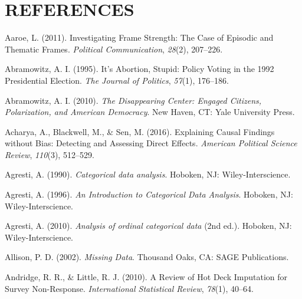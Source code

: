 \documentclass[12pt,econ]{sources/authesis}
\newenvironment{CSLReferences}%
  {}%
  {\par}
\begin{document}
\normalsize

\hypertarget{references}{%
\chapter*{REFERENCES}\label{references}}

\noindent

\ssp

\hypertarget{refs}{}
\begin{CSLReferences}{1}{0}
\leavevmode{}%
Aaroe, L. (2011). Investigating {Frame} {Strength}: {The} {Case} of {Episodic} and {Thematic} {Frames}. \emph{Political Communication}, \emph{28}(2), 207--226.

\leavevmode{}%
Abramowitz, A. I. (1995). {It's Abortion, Stupid: Policy Voting in the 1992 Presidential Election}. \emph{The Journal of Politics}, \emph{57}(1), 176--186.

\leavevmode{}%
Abramowitz, A. I. (2010). \emph{The {Disappearing} {Center}: {Engaged} {Citizens}, {Polarization}, and {American} {Democracy}}. New Haven, CT: Yale University Press.

\leavevmode{}%
Acharya, A., Blackwell, M., \& Sen, M. (2016). {Explaining Causal Findings without Bias: Detecting and Assessing Direct Effects}. \emph{American Political Science Review}, \emph{110}(3), 512--529.

\leavevmode{}%
Agresti, A. (1990). \emph{Categorical data analysis}. Hoboken, NJ: Wiley-Interscience.

\leavevmode{}%
Agresti, A. (1996). \emph{An {Introduction} to {Categorical} {Data} {Analysis}}. Hoboken, NJ: Wiley-Interscience.

\leavevmode{}%
Agresti, A. (2010). \emph{Analysis of ordinal categorical data} (2nd ed.). Hoboken, NJ: Wiley-Interscience.

\leavevmode{}%
Allison, P. D. (2002). \emph{{Missing Data}}. {Thousand Oaks, CA}: {SAGE Publications}.

\leavevmode{}%
Andridge, R. R., \& Little, R. J. (2010). {A Review of Hot Deck Imputation for Survey Non-Response}. \emph{International Statistical Review}, \emph{78}(1), 40--64.


\end{CSLReferences}
\end{document}

